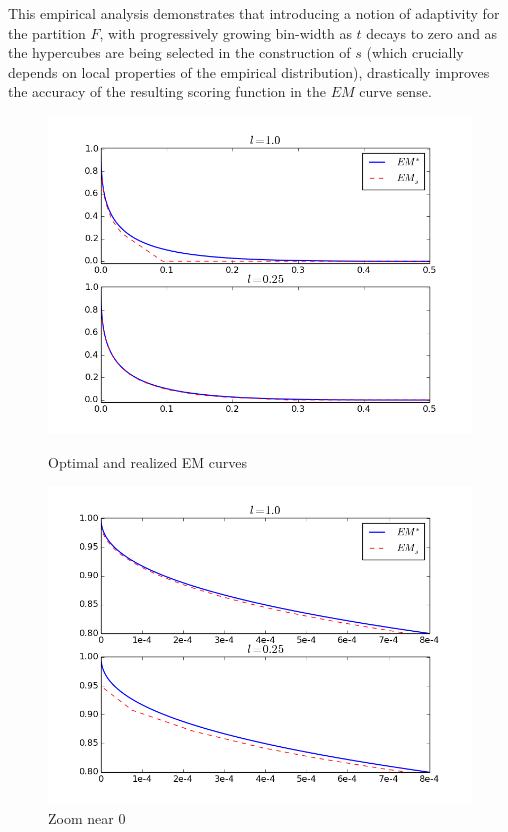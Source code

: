 This empirical analysis demonstrates that introducing a notion of adaptivity for the partition $F$, with progressively growing bin-width as $t$ decays to zero and as the hypercubes are being selected in the construction of $s$ (which crucially depends on local properties of the empirical distribution), drastically improves the accuracy of the resulting scoring function in the $EM$ curve sense. 
\noindent
\begin{figure}[!ht]
\begin{minipage}[c]{.5\linewidth}
\begin{center}
\includegraphics[width=\linewidth]{fig_source/EM-EMS.png}
\caption{Optimal and realized EM curves} %
\label{aistat:EMMS}
\end{center}
\end{minipage}
\hfill
\begin{minipage}[c]{.5\linewidth}
\begin{center}
\includegraphics[width=\linewidth]{fig_source/EM-EMSzoom.png}
\caption{Zoom near 0 ~~~~~~~~~~~~~~~~~~~~~~~~~~~~~~~~~~~~~~~~~~~~~~~~~} %
\label{aistat:EMMSzoom}
\end{center}
\end{minipage}
\end{figure}


